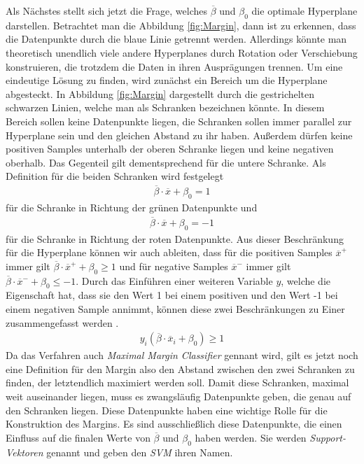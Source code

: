 \documentclass[
]{article}
\begin{document}
Als Nächstes stellt sich jetzt die Frage, welches \(\overline{\beta}\)
und \(\beta_0\) die optimale Hyperplane darstellen. Betrachtet man die
Abbildung \ref{fig:Margin}, dann ist zu erkennen, dass die Datenpunkte
durch die blaue Linie getrennt werden. Allerdings könnte man theoretisch
unendlich viele andere Hyperplanes durch Rotation oder Verschiebung
konstruieren, die trotzdem die Daten in ihren Ausprägungen trennen. Um
eine eindeutige Lösung zu finden, wird zunächst ein Bereich um die
Hyperplane abgesteckt. In Abbildung \ref{fig:Margin} dargestellt durch
die gestrichelten schwarzen Linien, welche man als Schranken bezeichnen
könnte. In diesem Bereich sollen keine Datenpunkte liegen, die Schranken
sollen immer parallel zur Hyperplane sein und den gleichen Abstand zu
ihr haben. Außerdem dürfen keine positiven Samples unterhalb der oberen
Schranke liegen und keine negativen oberhalb. Das Gegenteil gilt
dementsprechend für die untere Schranke. Als Definition für die beiden
Schranken wird festgelegt \begin{align}
\overline{\beta}\cdot \overline{x}+\beta_0=1\label{eq:posSV}
\end{align} für die Schranke in Richtung der grünen Datenpunkte und
\begin{align}
\overline{\beta}\cdot \overline{x}+\beta_0=-1\label{eq:negSV}
\end{align} für die Schranke in Richtung der roten Datenpunkte. Aus
dieser Beschränkung für die Hyperplane können wir auch ableiten, dass
für die positiven Samples \(\overline{x}^+\) immer gilt
\(\overline{\beta}\cdot \overline{x}^++\beta_0\ge 1\) und für negative
Samples \(\overline{x}^-\) immer gilt
\(\overline{\beta}\cdot \overline{x}^-+\beta_0\le -1\). Durch das
Einführen einer weiteren Variable \(y\), welche die Eigenschaft hat,
dass sie den Wert 1 bei einem positiven und den Wert -1 bei einem
negativen Sample annimmt, können diese zwei Beschränkungen zu Einer
zusammengefasst werden \parencite{cortesSupportvectorNetworks1995}.
\begin{align}
y_i(\overline{\beta}\cdot \overline{x}_i+\beta_0)\ge 1\label{eq:Nebenbedingung}
\end{align} Da das Verfahren auch \textit{Maximal Margin Classifier}
gennant wird, gilt es jetzt noch eine Definition für den Margin also den
Abstand zwischen den zwei Schranken zu finden, der letztendlich
maximiert werden soll. Damit diese Schranken, maximal weit auseinander
liegen, muss es zwangsläufig Datenpunkte geben, die genau auf den
Schranken liegen. Diese Datenpunkte haben eine wichtige Rolle für die
Konstruktion des Margins. Es sind ausschließlich diese Datenpunkte, die
einen Einfluss auf die finalen Werte von \(\overline{\beta}\) und
\(\beta_0\) haben werden. Sie werden \textit{Support-Vektoren} genannt
und geben den \textit{SVM} ihren Namen.
\end{document}
